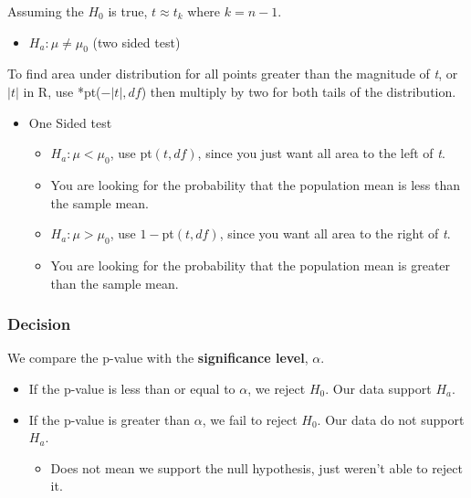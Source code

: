 \documentclass[
  openany]{book}
\providecommand{\tightlist}{%
  \setlength{\itemsep}{0pt}\setlength{\parskip}{0pt}}
\begin{document}
Assuming the \(H_0\) is true, \(t\approx t_k\) where \(k=n-1\).

\begin{itemize}
\tightlist
\item
  \(H_a: \mu \ne \mu_0\) (two sided test)
\end{itemize}

To find area under distribution for all points greater than the magnitude of \emph{t}, or \(|t|\) in R, use *pt(\(-|t|,df\)) then multiply by two for both tails of the distribution.

\begin{itemize}
\tightlist
\item
  One Sided test

  \begin{itemize}
  \tightlist
  \item
    \(H_a: \mu < \mu_0\), use pt\((t,df)\), since you just want all area to the left of \emph{t}.
  \item
    You are looking for the probability that the population mean is less than the sample mean.
  \item
    \(H_a: \mu > \mu_0\), use \(1-\)pt\((t,df)\), since you want all area to the right of \emph{t}.
  \item
    You are looking for the probability that the population mean is greater than the sample mean.
  \end{itemize}
\end{itemize}

\subsubsection{Decision}\label{decision}

We compare the p-value with the \textbf{significance level}, \(\alpha\).

\begin{itemize}
\tightlist
\item
  If the p-value is less than or equal to \(\alpha\), we reject \(H_0\). Our data support \(H_a\).
\item
  If the p-value is greater than \(\alpha\), we fail to reject \(H_0\). Our data do not support \(H_a\).

  \begin{itemize}
  \tightlist
  \item
    Does not mean we support the null hypothesis, just weren't able to reject it.
  \end{itemize}
\end{itemize}
\end{document}
